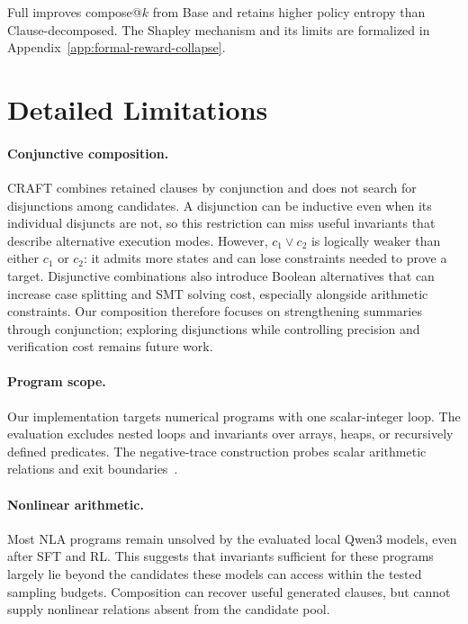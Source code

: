 Full improves compose@\(k\) from Base and retains higher policy entropy than
Clause-decomposed. The Shapley mechanism and its limits are formalized in
Appendix~\ref{app:formal-reward-collapse}.

\endgroup

\section{Detailed Limitations}
\label{app:limitations}

\paragraph{Conjunctive composition.}
CRAFT combines retained clauses by conjunction and does not search for
disjunctions among candidates. A disjunction can be inductive even when its
individual disjuncts are not, so this restriction can miss useful invariants
that describe alternative execution modes. However, \(c_1\lor c_2\) is
logically weaker than either \(c_1\) or \(c_2\): it admits more states and
can lose constraints needed to prove a target. Disjunctive combinations also
introduce Boolean alternatives that can increase case splitting and SMT
solving cost, especially alongside arithmetic constraints. Our composition
therefore focuses on strengthening summaries through conjunction; exploring
disjunctions while controlling precision and verification cost remains future
work.

\paragraph{Program scope.}
Our implementation targets numerical programs with one scalar-integer loop.
The evaluation excludes nested loops and invariants over arrays, heaps, or
recursively defined predicates. The negative-trace construction probes scalar
arithmetic relations and exit boundaries~\citep{liu2024towards}.

\paragraph{Nonlinear arithmetic.}
Most NLA programs remain unsolved by the evaluated local Qwen3 models,
even after SFT and RL. This suggests that invariants sufficient for these
programs largely lie beyond the candidates these models can access within
the tested sampling budgets. Composition can recover useful generated
clauses, but cannot supply nonlinear relations absent from the candidate pool.


